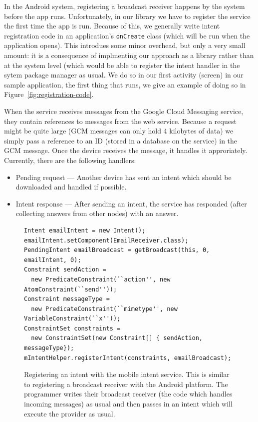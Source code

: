 \documentclass{acm_proc_article-sp}
\begin{document}
In the Android system, registering a broadcast receiver happens by the
system before the app runs.  Unfortunately, in our library we have to
register the service the first time the app is run.  Because of this,
we generally write intent registration code in an application's
\texttt{onCreate} class (which will be run when the application
opens).  This introdues some minor overhead, but only a very small
amount: it is a consequence of implmenting our approach as a library
rather than at the system level (which would be able to register the
intent handler in the sytem package manager as usual.  We do so in our
first activity (screen) in our sample application, the first thing
that runs, we give an example of doing so in
Figure~\ref{fig:registration-code}.

When the service receives messages from the Google Cloud Messaging
service, they contain references to messages from the web service.
Because a request might be quite large (GCM messages can only hold 4
kilobytes of data) we simply pass a reference to an ID (stored in a
database on the service) in the GCM message.  Once the device receives
the message, it handles it approriately.  Currently, there are the
following handlers:

\begin{itemize}
\item Pending request --- Another device has sent an intent which
  should be downloaded and handled if possible.
\item Intent response --- After sending an intent, the service has
  responded (after collecting answers from other nodes) with an
  answer.
\end{itemize}

\begin{figure}
\begin{lstlisting}
Intent emailIntent = new Intent();
emailIntent.setComponent(EmailReceiver.class);
PendingIntent emailBroadcast = getBroadcast(this, 0, emailIntent, 0);
Constraint sendAction = 
  new PredicateConstraint(``action'', new AtomConstraint(``send''));
Constraint messageType = 
  new PredicateConstraint(``mimetype'', new VariableConstraint(``x''));
ConstraintSet constraints = 
  new ConstraintSet(new Constraint[] { sendAction, messageType});
mIntentHelper.registerIntent(constraints, emailBroadcast);
\end{lstlisting}
\caption{Registering an intent with the mobile intent service.  This
  is similar to registering a broadcast receiver with the Android
  platform.  The programmer writes their broadcast receiver (the code
  which handles incoming messages) as usual and then passes in an
  intent which will execute the provider as usual.}
\end{figure}
\end{document}
